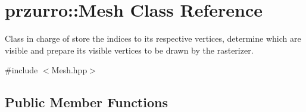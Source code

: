 \hypertarget{classprzurro_1_1_mesh}{}\section{przurro\+::Mesh Class Reference}
\label{classprzurro_1_1_mesh}


Class in charge of store the indices to it\textquotesingle{}s respective vertices, determine which are visible and prepare it\textquotesingle{}s visible vertices to be drawn by the rasterizer.  




{\ttfamily \#include $<$Mesh.\+hpp$>$}

\subsection*{Public Member Functions}
